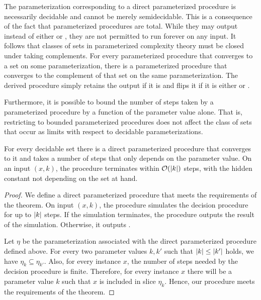 The parameterization corresponding to a direct parameterized procedure is necessarily decidable and cannot be merely semidecidable.
This is a consequence of the fact that parameterized procedures are total.
While they may output  instead of either  or , they are not permitted to run forever on any input.
It follows that classes of sets in parameterized complexity theory must be closed under taking complements.
For every parameterized procedure that converges to a set on some parameterization, there is a parameterized procedure that converges to the complement of that set on the same parameterization.
The derived procedure simply retains the output if it is  and flips it if it is either  or .

Furthermore, it is possible to bound the number of steps taken by a parameterized procedure by a function of the parameter value alone.
That is, restricting to bounded parameterized procedures does not affect the class of sets that occur as limits with respect to decidable parameterizations.

\begin{theorem}
\label{thm:slow_decidable}
  For every decidable set there is a direct parameterized procedure that converges to it and takes a number of steps that only depends on the parameter value.
  On an input $(x, k)$, the procedure terminates within $\operatorname{\mathcal{O}}({\lvert k\rvert})$ steps, with the hidden constant not depending on the set at hand.
\end{theorem}
\begin{proof}
  We define a direct parameterized procedure that meets the requirements of the theorem.
  On input $(x, k)$, the procedure simulates the decision procedure for up to ${\lvert k\rvert}$ steps.
  If the simulation terminates, the procedure outputs the result of the simulation.
  Otherwise, it outputs .

  Let $\eta$ be the parameterization associated with the direct parameterized procedure defined above.
  For every two parameter values $k, k'$ such that ${\lvert k\rvert} \le {\lvert k'\rvert}$ holds, we have $\eta_k \subseteq \eta_{k'}$.
  Also, for every instance $x$, the number of steps needed by the decision procedure is finite.
  Therefore, for every instance $x$ there will be a parameter value $k$ such that $x$ is included in slice $\eta_k$.
  Hence, our procedure meets the requirements of the theorem.
\end{proof}

